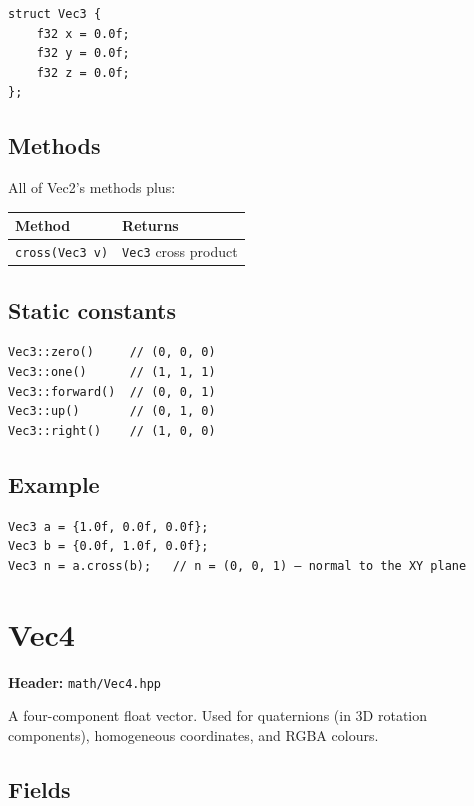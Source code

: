 \begin{lstlisting}
struct Vec3 {
    f32 x = 0.0f;
    f32 y = 0.0f;
    f32 z = 0.0f;
};
\end{lstlisting}

\subsection{Methods}

All of Vec2's methods plus:

\begin{longtable}{ll}
\toprule
\textbf{Method} & \textbf{Returns} \\
\midrule
\texttt{cross(Vec3 v)} & \texttt{Vec3} cross product \\
\bottomrule
\end{longtable}

\subsection{Static constants}

\begin{lstlisting}
Vec3::zero()     // (0, 0, 0)
Vec3::one()      // (1, 1, 1)
Vec3::forward()  // (0, 0, 1)
Vec3::up()       // (0, 1, 0)
Vec3::right()    // (1, 0, 0)
\end{lstlisting}

\subsection{Example}

\begin{lstlisting}
Vec3 a = {1.0f, 0.0f, 0.0f};
Vec3 b = {0.0f, 1.0f, 0.0f};
Vec3 n = a.cross(b);   // n = (0, 0, 1) — normal to the XY plane
\end{lstlisting}

\section{Vec4}
\label{sec:vec4}

\textbf{Header:} \texttt{math/Vec4.hpp}

A four-component float vector. Used for quaternions (in 3D rotation
components), homogeneous coordinates, and RGBA colours.

\subsection{Fields}

